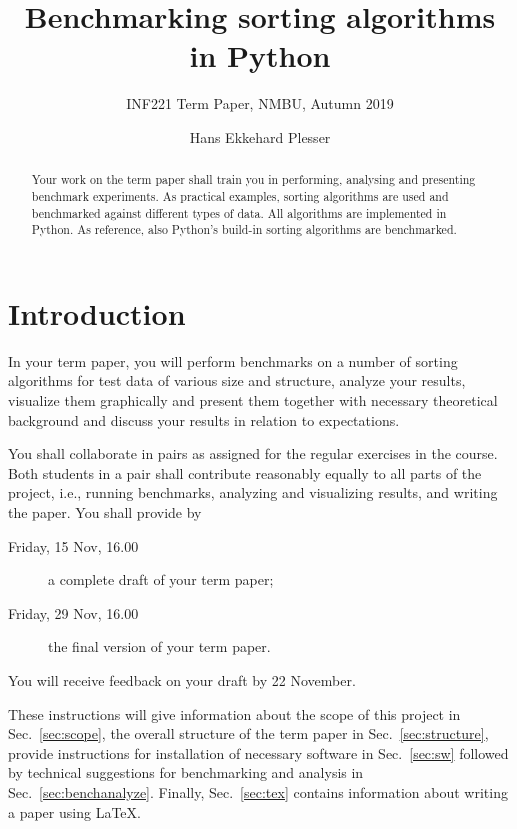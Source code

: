 \documentclass[sigconf, nonacm, natbib, screen, balance=False]{acmart}
\begin{document}
\title{Benchmarking sorting algorithms in Python}
\subtitle{INF221 Term Paper, NMBU, Autumn 2019}

\author{Hans Ekkehard Plesser}

\begin{abstract}
Your work on the term paper shall train you in performing, analysing
and presenting benchmark experiments. As practical examples, sorting
algorithms are used and benchmarked against different types of
data. All algorithms are implemented in Python. As reference, also
Python's build-in sorting algorithms are benchmarked.
\end{abstract}



\maketitle

\section{Introduction}\label{sec:intro}

In your term paper, you will perform benchmarks on a number of sorting
algorithms for test data of various size and structure, analyze your
results, visualize them graphically and present them together with
necessary theoretical background and discuss your results in relation
to expectations.

You shall collaborate in pairs as assigned for the regular exercises
in the course. Both students in a pair shall contribute reasonably
equally to all parts of the project, i.e., running benchmarks,
analyzing and visualizing results, and writing the paper. You shall
provide by
\begin{description}
\item[Friday, 15 Nov, 16.00] a complete draft of your term paper;
\item[Friday, 29 Nov, 16.00] the final version of your term paper.
\end{description}
You will receive feedback on your draft by 22 November.

These instructions will give information about the scope of this
project in Sec.~\ref{sec:scope}, the overall structure of the term
paper in Sec.~\ref{sec:structure}, provide instructions for
installation of necessary software in Sec.~\ref{sec:sw} followed by
technical suggestions for benchmarking and analysis in
Sec.~\ref{sec:benchanalyze}. Finally, Sec.~\ref{sec:tex} contains
information about writing a paper using \LaTeX.
\end{document}
